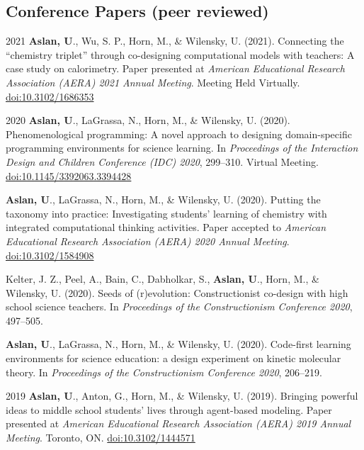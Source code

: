 \documentclass[11pt,letterpaper]{report} %
\begin{document}
    \subsection*{Conference Papers (peer reviewed)}

    \begin{tablist}

        \item[2021] \tab{}\textbf{Aslan, U}., Wu, S. P., Horn, M., \& Wilensky, U. (2021). Connecting the \enquote{chemistry triplet} through co-designing computational models with teachers: A case study on calorimetry. Paper presented at \textit{American Educational Research Association (AERA) 2021 Annual Meeting}. Meeting Held Virtually. \href{https://doi.org/10.3102/1686353}{doi:10.3102/1686353}

        \item[2020] \tab{}\textbf{Aslan, U}., LaGrassa, N., Horn, M., \& Wilensky, U. (2020). Phenomenological programming: A novel approach to designing domain-specific programming environments for science learning. In \textit{Proceedings of the Interaction Design and Children Conference (IDC) 2020}, 299--310. Virtual Meeting. \href{https://doi.org/10.1145/3392063.3394428}{doi:10.1145/3392063.3394428}

        \item[] \tab{}\textbf{Aslan, U}., LaGrassa, N., Horn, M., \& Wilensky, U. (2020). Putting the taxonomy into practice: Investigating students’ learning of chemistry with integrated computational thinking activities. Paper accepted to \textit{American Educational Research Association (AERA) 2020 Annual Meeting}. \href{https://doi.org/10.3102/1584908}{doi:10.3102/1584908}

        \item[] \tab{}Kelter, J. Z., Peel, A., Bain, C., Dabholkar, S., \textbf{Aslan, U}., Horn, M., \& Wilensky, U. (2020). Seeds of (r)evolution: Constructionist co-design with high school science teachers. In \textit{Proceedings of the Constructionism Conference 2020}, 497--505.

        \item[] \tab{}\textbf{Aslan, U}., LaGrassa, N., Horn, M., \& Wilensky, U. (2020). Code-first learning environments for science education: a design experiment on kinetic molecular theory. In \textit{Proceedings of the Constructionism Conference 2020}, 206--219.

        \item[2019] \tab{}\textbf{Aslan, U}., Anton, G., Horn, M., \& Wilensky, U. (2019). Bringing powerful ideas to middle school students' lives through agent-based modeling. Paper presented at \textit{American Educational Research Association (AERA) 2019 Annual Meeting}. Toronto, ON. \href{https://doi.org/10.3102/1444571}{doi:10.3102/1444571}


\end{tablist}
\end{document}
